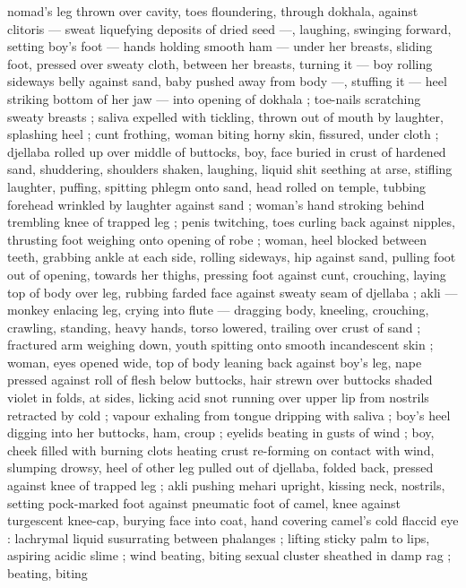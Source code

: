 nomad's leg thrown over cavity, toes floundering, through dokhala, 
against clitoris --- sweat liquefying deposits of dried seed ---, 
laughing, swinging forward, setting boy's foot --- hands holding 
smooth ham --- under her breasts, sliding foot, pressed over sweaty 
cloth, between her breasts, turning it --- boy rolling sideways belly 
against sand, baby pushed away from body ---, stuffing it --- heel 
striking bottom of her jaw --- into opening of dokhala ; toe-nails 
scratching sweaty breasts ; saliva expelled with tickling, thrown out 
of mouth by laughter, splashing heel ; cunt frothing, woman biting 
horny skin, fissured, under cloth ; djellaba rolled up over middle of 
buttocks, boy, face buried in crust of hardened sand, shuddering, 
shoulders shaken, laughing, liquid shit seething at arse, stifling 
laughter, puffing, spitting phlegm onto sand, head rolled on temple, 
tubbing forehead wrinkled by laughter against sand ; woman's hand 
stroking behind trembling knee of trapped leg ; penis twitching, toes 
curling back against nipples, thrusting foot weighing onto opening of 
robe ; woman, heel blocked between teeth, grabbing ankle at each 
side, rolling sideways, hip against sand, pulling foot out of opening, 
towards her thighs, pressing foot against cunt, crouching, laying top 
of body over leg, rubbing farded face against sweaty seam of 
djellaba ; akli --- monkey enlacing leg, crying into flute --- dragging 
body, kneeling, crouching, crawling, standing, heavy hands, torso 
lowered, trailing over crust of sand ; fractured arm weighing down, 
youth spitting onto smooth incandescent skin ; woman, eyes opened 
wide, top of body leaning back against boy's leg, nape pressed 
against roll of flesh below buttocks, hair strewn over buttocks shaded 
violet in folds, at sides, licking acid snot running over upper lip from 
nostrils retracted by cold ; vapour exhaling from tongue dripping with 
saliva ; boy's heel digging into her buttocks, ham, croup ; eyelids 
beating in gusts of wind ; boy, cheek filled with burning clots heating 
crust re-forming on contact with wind, slumping drowsy, heel of other 
leg pulled out of djellaba, folded back, pressed against knee of 
trapped leg ; akli pushing mehari upright, kissing neck, nostrils, 
setting pock-marked foot against pneumatic foot of camel, knee 
against turgescent knee-cap, burying face into coat, hand covering 
camel's cold flaccid eye : lachrymal liquid susurrating between 
phalanges ; lifting sticky palm to lips, aspiring acidic slime ; wind 
beating, biting sexual cluster sheathed in damp rag ; beating, biting 
